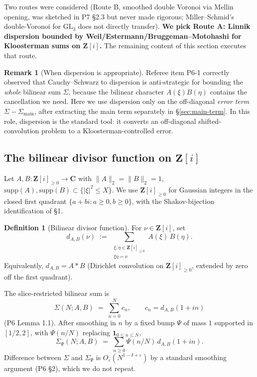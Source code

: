 \documentclass[11pt]{article}
\theoremstyle{definition}
\newtheorem{definition}[theorem]{Definition}
\newtheorem{remark}[theorem]{Remark}
\newcommand{\Z}{\mathbf{Z}}
\newcommand{\C}{\mathbf{C}}
\newcommand{\Zi}{\Z[i]}
\begin{document}
Two routes were considered (Route B, smoothed double Voronoi via Mellin opening, was sketched in P7 \S2.3 but never made rigorous; Miller--Schmid's double-Voronoi for $\mathrm{GL}_3$ does not directly transfer). \textbf{We pick Route A: Linnik dispersion bounded by Weil/Estermann/Bruggeman--Motohashi for Kloosterman sums on $\Zi$.} The remaining content of this section executes that route.

\begin{remark}[When dispersion is appropriate]\label{rem:dispersion-when}
Referee item P6-1 correctly observed that Cauchy--Schwarz to dispersion is anti-strategic for bounding the \emph{whole} bilinear sum $\Sigma$, because the bilinear character $A(\xi)B(\eta)$ contains the cancellation we need. Here we use dispersion only on the off-diagonal \emph{error term} $\Sigma-\Sigma_{\mathrm{main}}$, after extracting the main term separately in \S\ref{sec:main-term}. In this role, dispersion is the standard tool: it converts an off-diagonal shifted-convolution problem to a Kloosterman-controlled error.
\end{remark}

\subsection{The bilinear divisor function on \texorpdfstring{$\Zi$}{Z[i]}}\label{sec:dab-def}

Let $A,B:\Zi_{\ge 0}\to\C$ with $\|A\|_2=\|B\|_2=1$, $\mathrm{supp}(A),\mathrm{supp}(B)\subset\{|\xi|^2\le X\}$. We use $\Zi_{\ge 0}$ for Gaussian integers in the closed first quadrant $\{a+bi:a\ge 0,b\ge 0\}$, with the Shakov-bijection identification of \S1.

\begin{definition}[Bilinear divisor function]\label{def:dab}
For $\nu\in\Zi$, set
\[
d_{A,B}(\nu)\;:=\;\sum_{\substack{\xi,\eta\in\Zi_{\ge 0}\\ \xi\eta=\nu}}A(\xi)\,B(\eta).
\]
Equivalently, $d_{A,B}=A*B$ (Dirichlet convolution on $\Zi_{\ge 0}$, extended by zero off the first quadrant).
\end{definition}

The slice-restricted bilinear sum is
\[
\Sigma(N;A,B)\;=\;\sum_{n=0}^N c_n,\qquad c_n=d_{A,B}(1+in)
\]
(P6 Lemma 1.1). After smoothing in $n$ by a fixed bump $\Psi$ of mass $1$ supported in $[1/2,2]$, with $\Psi(n/N)$ replacing $\mathbf{1}_{0\le n\le N}$,
\[
\Sigma_\Psi(N;A,B)\;=\;\sum_{n\ge 0}\Psi(n/N)\,d_{A,B}(1+in).
\]
Difference between $\Sigma$ and $\Sigma_\Psi$ is $O_\varepsilon(N^{1-\delta+\varepsilon})$ by a standard smoothing argument (P6 \S2), which we do not repeat.
\end{document}

